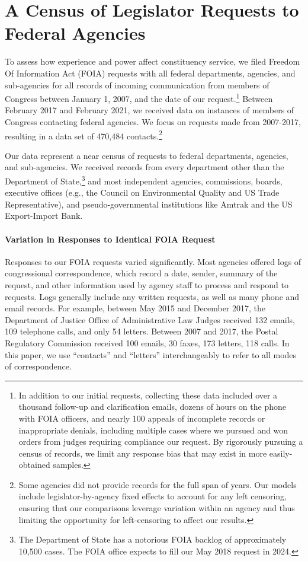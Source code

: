 \documentclass[12pt]{article}
\begin{document}
\section{A Census of Legislator Requests to Federal Agencies} \label{s:data}
To assess how experience and power affect constituency service, we filed   Freedom Of Information Act (FOIA) requests with all federal departments, agencies, and sub-agencies for all records of incoming communication from members of Congress between January 1, 2007, and the date of our request.\footnote{In addition to our initial requests, collecting these data included over a thousand follow-up and clarification emails, dozens of hours on the phone with FOIA officers, and nearly 100 appeals of incomplete records or inappropriate denials, including multiple cases where we pursued and won orders from judges requiring compliance our request. By rigorously pursuing a census of records, we limit any response bias that may exist in more easily-obtained samples.} Between February 2017 and February 2021, we received data on  instances of members of Congress contacting federal agencies. We focus on requests made from 2007-2017, resulting in a data set of 470,484 contacts.\footnote{Some agencies did not provide records for the full span of years. Our models include legislator-by-agency fixed effects to account for any left censoring, ensuring that our comparisons leverage variation within an agency and thus limiting the opportunity for left-censoring to affect our results.}  %

Our data represent a near census of requests to federal departments, agencies, and sub-agencies. We received records from every department other than the Department of State,\footnote{The Department of State has a notorious FOIA backlog of approximately 10,500 cases. The FOIA office expects to fill our May 2018 request in 2024.} and most independent agencies, commissions, boards, executive offices (e.g., the Council on Environmental Quality and US Trade Representative), and pseudo-governmental institutions like Amtrak and the US Export-Import Bank. 

\paragraph{Variation in Responses to Identical FOIA Request} Responses to our FOIA requests varied significantly. Most agencies offered logs of congressional correspondence, which record a date, sender, summary of the request, and other information used by agency staff to process and respond to requests. Logs generally include any written requests, as well as many phone and email records. For example, between May 2015 and December 2017, the Department of Justice Office of Administrative Law Judges received 132 emails, 109 telephone calls, and only 54 letters. Between 2007 and 2017, the Postal Regulatory Commission received 100 emails, 30 faxes, 173 letters, 118 calls. In this paper, we use ``contacts'' and ``letters'' interchangeably to refer to all modes of correspondence. 
\end{document}

